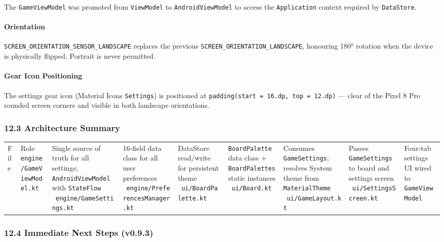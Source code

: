 \documentclass[11pt,a4paper]{article}
\begin{document}
The \texttt{GameViewModel} was promoted from \texttt{ViewModel} to
\texttt{AndroidViewModel} to access the \texttt{Application} context
required by \texttt{DataStore}.

\paragraph{Orientation}\label{orientation-v092}

\texttt{SCREEN\_ORIENTATION\_SENSOR\_LANDSCAPE} replaces the previous
\texttt{SCREEN\_ORIENTATION\_LANDSCAPE}, honouring 180° rotation when
the device is physically flipped. Portrait is never permitted.

\paragraph{Gear Icon Positioning}\label{gear-icon-v092}

The settings gear icon (Material Icons \texttt{Settings}) is positioned
at \texttt{padding(start = 16.dp, top = 12.dp)} --- clear of the Pixel
8 Pro rounded screen corners and visible in both landscape orientations.

\subsubsection{12.3 Architecture
Summary}\label{architecture-summary-v092}

\begin{longtable}[]{@{}ll@{}}
\toprule\noalign{}
File & Role \
\midrule\noalign{}
\endhead
\bottomrule\noalign{}
\endlastfoot
\texttt{engine/GameViewModel.kt} & Single source of truth for all settings; \texttt{AndroidViewModel} with \texttt{StateFlow} \
\texttt{engine/GameSettings.kt} & 16-field data class for all user preferences \
\texttt{engine/PreferencesManager.kt} & DataStore read/write for persistent theme \
\texttt{ui/BoardPalette.kt} & \texttt{BoardPalette} data class + \texttt{BoardPalettes} static instances \
\texttt{ui/Board.kt} & Consumes \texttt{GameSettings}; resolves System theme from \texttt{MaterialTheme} \
\texttt{ui/GameLayout.kt} & Passes \texttt{GameSettings} to board and settings screen \
\texttt{ui/SettingsScreen.kt} & Four-tab settings UI wired to \texttt{GameViewModel} \
\end{longtable}

\subsubsection{12.4 Immediate Next Steps
(v0.9.3)}\label{immediate-next-steps-v093}
\end{document}
